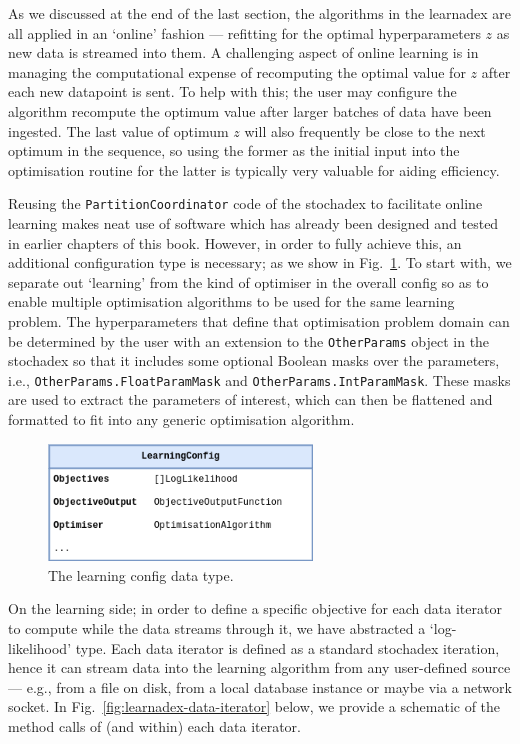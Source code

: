 As we discussed at the end of the last section, the algorithms in the learnadex are all applied in an `online' fashion --- refitting for the optimal hyperparameters $z$ as new data is streamed into them. A challenging aspect of online learning is in managing the computational expense of recomputing the optimal value for $z$ after each new datapoint is sent. To help with this; the user may configure the algorithm recompute the optimum value after larger batches of data have been ingested. The last value of optimum $z$ will also frequently be close to the next optimum in the sequence, so using the former as the initial input into the optimisation routine for the latter is typically very valuable for aiding efficiency.

Reusing the \texttt{PartitionCoordinator} code of the stochadex to facilitate online learning makes neat use of software which has already been designed and tested in earlier chapters of this book. However, in order to fully achieve this, an additional configuration type is necessary; as we show in Fig.~\ref{fig:learnadex-data-types-design}. To start with, we separate out `learning' from the kind of optimiser in the overall config so as to enable multiple optimisation algorithms to be used for the same learning problem. The hyperparameters that define that optimisation problem domain can be determined by the user with an extension to the \texttt{OtherParams} object in the stochadex so that it includes some optional Boolean masks over the parameters, i.e., \texttt{OtherParams.FloatParamMask} and \texttt{OtherParams.IntParamMask}. These masks are used to extract the parameters of interest, which can then be flattened and formatted to fit into any generic optimisation algorithm.

\begin{figure}[h]
\centering
\includegraphics[width=7cm]{images/chapter-3-learnadex-data-types.drawio.png}
\caption{The learning config data type.}
\label{fig:learnadex-data-types-design}
\end{figure}

On the learning side; in order to define a specific objective for each data iterator to compute while the data streams through it, we have abstracted a `log-likelihood' type. Each data iterator is defined as a standard stochadex iteration, hence it can stream data into the learning algorithm from any user-defined source --- e.g., from a file on disk, from a local database instance or maybe via a network socket. In Fig.~\ref{fig:learnadex-data-iterator} below, we provide a schematic of the method calls of (and within) each data iterator.

